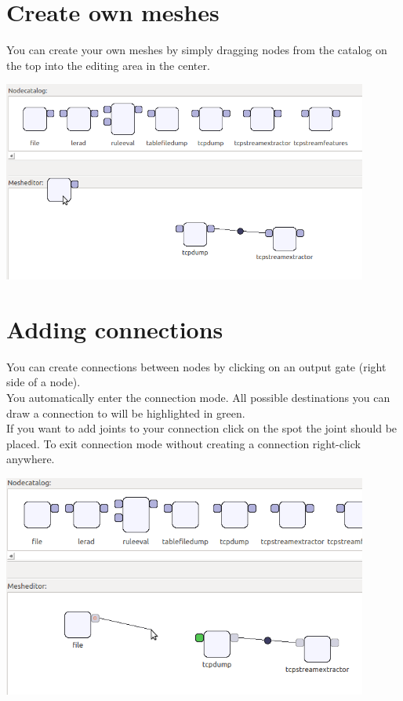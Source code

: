 \documentclass[12pt, accentcolor=tud1b]{tudreport}
\begin{document}
\section*{Create own meshes}
You can create your own meshes by simply dragging nodes from the catalog on the top into the editing area in the center. 
\begin{center}\includegraphics[width=0.9\textwidth]{add_node_cut}\end{center}
\newpage

\section*{Adding connections}
You can create connections between nodes by clicking on an output gate (right side of a node).\\
You automatically enter the connection mode. All possible destinations you can draw a connection to
will be highlighted in green. \\
If you want to add joints to your connection click on the spot the joint
should be placed. To exit connection mode without creating a connection right-click anywhere.
\begin{center}\includegraphics[width=0.9\textwidth]{draw_connection_cut}\end{center}
\end{document}
